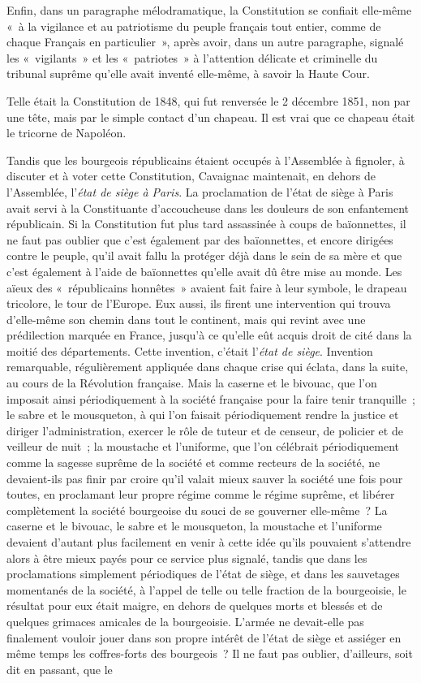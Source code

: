 \documentclass[french,twoside]{book} %
\begin{document}
Enfin, dans un paragraphe mélodramatique, la Constitution se confiait elle-même « à la vigilance et au patriotisme du peuple français tout entier, comme de chaque Français en particulier », après avoir, dans un autre paragraphe, signalé les « vigilants » et les « patriotes » à l’attention délicate et criminelle du tribunal suprême qu’elle avait inventé elle-même, à savoir la Haute Cour.\par
Telle était la Constitution de 1848, qui fut renversée le 2 décembre 1851, non par une tête, mais par le simple contact d’un chapeau. Il est vrai que ce chapeau était le tricorne de Napoléon.\par
Tandis que les bourgeois républicains étaient occupés à l’Assemblée à fignoler, à discuter et à voter cette Constitution, Cavaignac maintenait, en dehors de l’Assemblée, l’\emph{état de siège à Paris}. La proclamation de l’état de siège à Paris avait servi à la Constituante d’accoucheuse dans les douleurs de son enfantement républicain. Si la Constitution fut plus tard assassinée à coups de baïonnettes, il ne faut pas oublier que c’est également par des baïonnettes, et encore dirigées contre le peuple, qu’il avait fallu la protéger déjà dans le sein de sa mère et que c’est également à l’aide de baïonnettes qu’elle avait dû être mise au monde. Les aïeux des « républicains honnêtes » avaient fait faire à leur symbole, le drapeau tricolore, le tour de l’Europe. Eux aussi, ils firent une intervention qui trouva d’elle-même son chemin dans tout le continent, mais qui revint avec une prédilection marquée en France, jusqu’à ce qu’elle eût acquis droit de cité dans la moitié des départements. Cette invention, c’était l’\emph{état de siège}. Invention remarquable, régulièrement appliquée dans chaque crise qui éclata, dans la suite, au cours de la Révolution française. Mais la caserne et le bivouac, que l’on imposait ainsi périodiquement à la société française pour la faire tenir tranquille ; le sabre et le mousqueton, à qui l’on faisait périodiquement rendre la justice et diriger l’administration, exercer le rôle de tuteur et de censeur, de policier et de veilleur de nuit ; la moustache et l’uniforme, que l’on célébrait périodiquement comme la sagesse suprême de la société et comme recteurs de la société, ne devaient-ils pas finir par croire qu’il valait mieux sauver la société une fois pour toutes, en proclamant leur propre régime comme le régime suprême, et libérer complètement la société bourgeoise du souci de se gouverner elle-même ? La caserne et le bivouac, le sabre et le mousqueton, la moustache et l’uniforme devaient d’autant plus facilement en venir à cette idée qu’ils pouvaient s’attendre alors à être mieux payés pour ce service plus signalé, tandis que dans les proclamations simplement périodiques de l’état de siège, et dans les sauvetages momentanés de la société, à l’appel de telle ou telle fraction de la bourgeoisie, le résultat pour eux était maigre, en dehors de quelques morts et blessés et de quelques grimaces amicales de la bourgeoisie. L’armée ne devait-elle pas finalement vouloir jouer dans son propre intérêt de l’état de siège et assiéger en même temps les coffres-forts des bourgeois ? Il ne faut pas oublier, d’ailleurs, soit dit en passant, que le 
\end{document}
